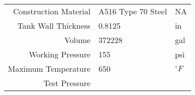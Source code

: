 \documentclass[10pt,parskip=half,
toc=sectionentrywithdots,
bibliography=totocnumbered,
captions=tableheading,numbers=noendperiod]{scrartcl}
\begin{document}
\begin{longtable}[]{@{}rll@{}}
\begin{minipage}[t]{0.23\columnwidth}
Construction Material\strut
\end{minipage} & \begin{minipage}[t]{0.23\columnwidth}\raggedright
A516 Type 70 Steel\strut
\end{minipage} & \begin{minipage}[t]{0.23\columnwidth}\raggedright
NA\strut
\end{minipage}\tabularnewline
\begin{minipage}[t]{0.23\columnwidth}\raggedleft
Tank Wall Thickness\strut
\end{minipage} & \begin{minipage}[t]{0.23\columnwidth}\raggedright
0.8125\strut
\end{minipage} & \begin{minipage}[t]{0.23\columnwidth}\raggedright
in\strut
\end{minipage}\tabularnewline
\begin{minipage}[t]{0.23\columnwidth}\raggedleft
Volume\strut
\end{minipage} & \begin{minipage}[t]{0.23\columnwidth}\raggedright
372228\strut
\end{minipage} & \begin{minipage}[t]{0.23\columnwidth}\raggedright
gal\strut
\end{minipage}\tabularnewline
\begin{minipage}[t]{0.23\columnwidth}\raggedleft
Working Pressure\strut
\end{minipage} & \begin{minipage}[t]{0.23\columnwidth}\raggedright
155\strut
\end{minipage} & \begin{minipage}[t]{0.23\columnwidth}\raggedright
psi\strut
\end{minipage}\tabularnewline
\begin{minipage}[t]{0.23\columnwidth}\raggedleft
Maximum Temperature\strut
\end{minipage} & \begin{minipage}[t]{0.23\columnwidth}\raggedright
650\strut
\end{minipage} & \begin{minipage}[t]{0.23\columnwidth}\raggedright
\(^{\circ}F\)\strut
\end{minipage}\tabularnewline
\begin{minipage}[t]{0.23\columnwidth}\raggedleft
Test Pressure\strut
\end{minipage} & \begin{minipage}[t]{0.23\columnwidth}\raggedright

\end{minipage}
\end{longtable}
\end{document}

